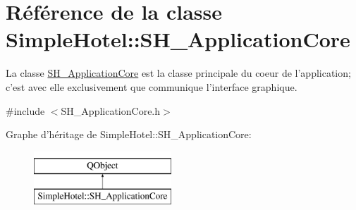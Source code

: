 \hypertarget{classSimpleHotel_1_1SH__ApplicationCore}{\section{Référence de la classe Simple\-Hotel\-:\-:S\-H\-\_\-\-Application\-Core}
\label{classSimpleHotel_1_1SH__ApplicationCore}
}


La classe \hyperlink{classSimpleHotel_1_1SH__ApplicationCore}{S\-H\-\_\-\-Application\-Core} est la classe principale du coeur de l'application; c'est avec elle exclusivement que communique l'interface graphique.  




{\ttfamily \#include $<$S\-H\-\_\-\-Application\-Core.\-h$>$}

Graphe d'héritage de Simple\-Hotel\-:\-:S\-H\-\_\-\-Application\-Core\-:\begin{figure}[H]
\begin{center}
\leavevmode
\includegraphics[height=2.000000cm]{classSimpleHotel_1_1SH__ApplicationCore}
\end{center}
\end{figure}
